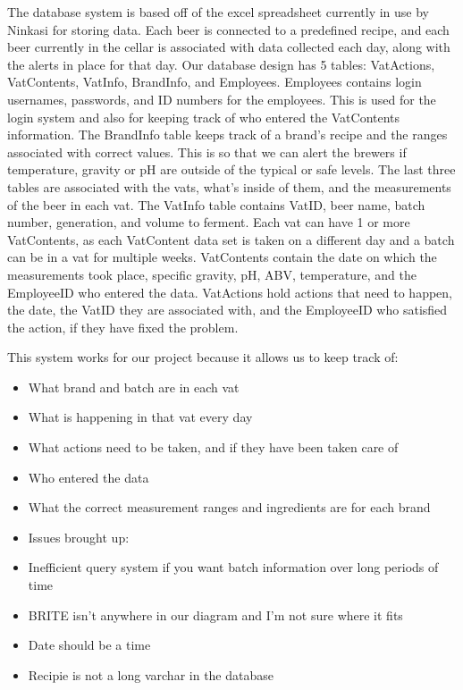 \documentclass[draftclsnofoot,onecolumn,letterpaper,10pt]{IEEEtran}
\begin{document}
		The database system is based off of the excel spreadsheet currently in use by Ninkasi for storing data.
		Each beer is connected to a predefined recipe, and each beer currently in the cellar is associated with data collected each day, along with the alerts in place for that day.
		Our database design has 5 tables: VatActions, VatContents, VatInfo, BrandInfo, and Employees.
		Employees contains login usernames, passwords, and ID numbers for the employees.
		This is used for the login system and also for keeping track of who entered the VatContents information.
		The BrandInfo table keeps track of a brand’s recipe and the ranges associated with correct values.
		This is so that we can alert the brewers if temperature, gravity or pH are outside of the typical or safe levels.
		The last three tables are associated with the vats, what’s inside of them, and the measurements of the beer in each vat.
		The VatInfo table contains VatID, beer name, batch number, generation, and volume to ferment.
		Each vat can have 1 or more VatContents, as each VatContent data set is taken on a different day and a batch can be in a vat for multiple weeks.
		VatContents contain the date on which the measurements took place, specific gravity, pH, ABV, temperature, and the EmployeeID who entered the data.
		VatActions hold actions that need to happen, the date, the VatID they are associated with, and the EmployeeID who satisfied the action, if they have fixed the problem.

		This system works for our project because it allows us to keep track of:

		\begin{itemize}
			\item What brand and batch are in each vat
			\item What is happening in that vat every day
			\item What actions need to be taken, and if they have been taken care of
			\item Who entered the data
			\item What the correct measurement ranges and ingredients are for each brand
		\end{itemize}

		\begin{itemize}
			\item Issues brought up:
			\item Inefficient query system if you want batch information over long periods of time
			\item BRITE isn’t anywhere in our diagram and I’m not sure where it fits
			\item Date should be a time
			\item Recipie is not a long varchar in the database
		\end{itemize}
\end{document}
